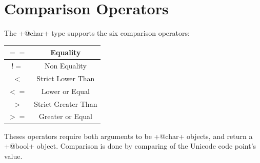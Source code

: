\section{Comparison Operators}

The \ggsq+@char+ type supports the six comparison operators:\newline

\begin{tabular}{|c|c|}
\hline
$==$ & Equality \\
\hline
$!=$ & Non Equality \\
\hline
$<$  & Strict Lower Than \\
\hline
$<=$  & Lower or Equal \\
\hline
$>$  & Strict Greater Than \\
\hline
$>=$  & Greater or Equal \\
\hline
\end{tabular}

Theses operators require both arguments to be \ggsq+@char+ objects, and return a \ggsq+@bool+ object. Comparison is done by comparing of the Unicode code point's value.


